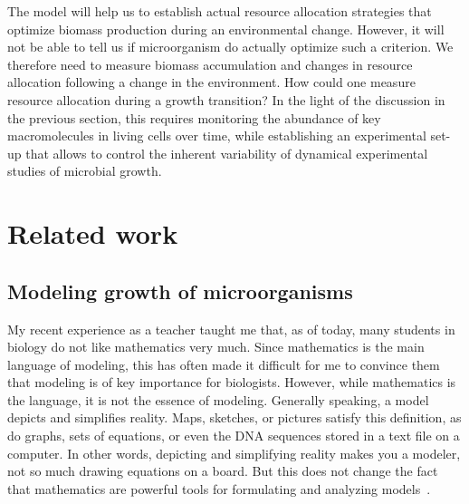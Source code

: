 The model will help us to establish actual resource allocation strategies that optimize biomass production during an environmental change.
However, it will not be able to tell us if microorganism do actually optimize such a criterion.
We therefore need to measure biomass accumulation and changes in resource allocation following a change in the environment.
How could one measure resource allocation during a growth transition?
In the light of the discussion in the previous section, this requires monitoring the abundance of key macromolecules in living cells over time, while establishing an experimental set-up that allows to control the inherent variability of dynamical experimental studies of microbial growth.

\section{Related work}

\subsection{Modeling growth of microorganisms}

My recent experience as a teacher taught me that, as of today, many students in biology do not like mathematics very much.
Since mathematics is the main language of modeling, this has often made it difficult for me to convince them that modeling is of key importance for biologists.
However, while mathematics is the language, it is not the essence of modeling.
Generally speaking, a model depicts and simplifies reality.
Maps, sketches, or pictures satisfy this definition, as do graphs, sets of equations, or even the DNA sequences stored in a text file on a computer.
In other words, depicting and simplifying reality makes you a modeler, not so much drawing equations on a board.
But this does not change the fact that mathematics are powerful tools for formulating and analyzing models~\cite{servedio_not_2014,mcgill_calm_2013}.

